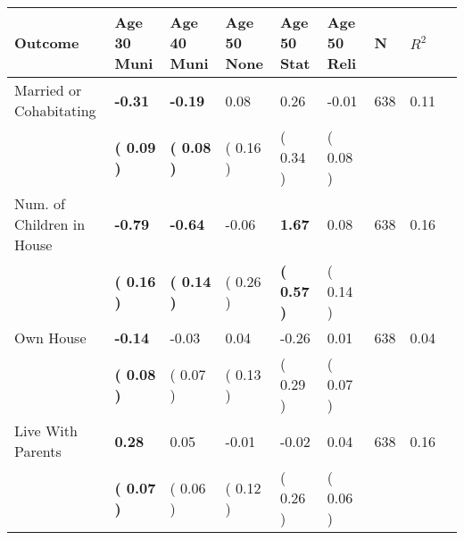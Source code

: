 \begin{tabular}{L{6.2cm} C{1.8cm} C{1.8cm} C{1.8cm} C{1.8cm} C{1.8cm} C{1.8cm} C{0.3cm} C{0.3cm}}
\toprule
 \textbf{Outcome} & \textbf{Age 30 Muni} & \textbf{Age 40 Muni} & \textbf{Age 50 None} & \textbf{Age 50 Stat} & \textbf{Age 50 Reli} & \textbf{N} & \textbf{$ R^2$} \\
\midrule
Married or Cohabitating & \textbf{    -0.31} & \textbf{    -0.19} &      0.08 &      0.26 &     -0.01  & 638 &       0.11 \\ 
 & \textbf{(     0.09 )} & \textbf{(     0.08 )} & (     0.16 ) & (     0.34 ) & (     0.08 )  & \\
Num. of Children in House & \textbf{    -0.79} & \textbf{    -0.64} &     -0.06 & \textbf{     1.67} &      0.08  & 638 &       0.16 \\ 
 & \textbf{(     0.16 )} & \textbf{(     0.14 )} & (     0.26 ) & \textbf{(     0.57 )} & (     0.14 )  & \\
Own House & \textbf{    -0.14} &     -0.03 &      0.04 &     -0.26 &      0.01  & 638 &       0.04 \\ 
 & \textbf{(     0.08 )} & (     0.07 ) & (     0.13 ) & (     0.29 ) & (     0.07 )  & \\
Live With Parents & \textbf{     0.28} &      0.05 &     -0.01 &     -0.02 &      0.04  & 638 &       0.16 \\ 
 & \textbf{(     0.07 )} & (     0.06 ) & (     0.12 ) & (     0.26 ) & (     0.06 )  & \\
\bottomrule
\end{tabular}
